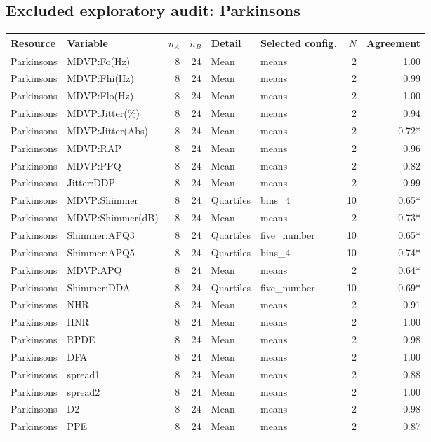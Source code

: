 \subsection*{Excluded exploratory audit: Parkinsons}
\small
\begin{longtable}{p{1.95cm}p{4.25cm}rrp{1.7cm}p{2.1cm}rr}
\toprule Resource & Variable & $n_A$ & $n_B$ & Detail & Selected config. & $N$ & Agreement\\\midrule\endhead
Parkinsons & MDVP:Fo(Hz) & 8 & 24 & Mean & means & 2 & 1.00\\
Parkinsons & MDVP:Fhi(Hz) & 8 & 24 & Mean & means & 2 & 0.99\\
Parkinsons & MDVP:Flo(Hz) & 8 & 24 & Mean & means & 2 & 1.00\\
Parkinsons & MDVP:Jitter(\%) & 8 & 24 & Mean & means & 2 & 0.94\\
Parkinsons & MDVP:Jitter(Abs) & 8 & 24 & Mean & means & 2 & 0.72*\\
Parkinsons & MDVP:RAP & 8 & 24 & Mean & means & 2 & 0.96\\
Parkinsons & MDVP:PPQ & 8 & 24 & Mean & means & 2 & 0.82\\
Parkinsons & Jitter:DDP & 8 & 24 & Mean & means & 2 & 0.99\\
Parkinsons & MDVP:Shimmer & 8 & 24 & Quartiles & bins\_4 & 10 & 0.65*\\
Parkinsons & MDVP:Shimmer(dB) & 8 & 24 & Mean & means & 2 & 0.73*\\
Parkinsons & Shimmer:APQ3 & 8 & 24 & Quartiles & five\_number & 10 & 0.65*\\
Parkinsons & Shimmer:APQ5 & 8 & 24 & Quartiles & bins\_4 & 10 & 0.74*\\
Parkinsons & MDVP:APQ & 8 & 24 & Mean & means & 2 & 0.64*\\
Parkinsons & Shimmer:DDA & 8 & 24 & Quartiles & five\_number & 10 & 0.69*\\
Parkinsons & NHR & 8 & 24 & Mean & means & 2 & 0.91\\
Parkinsons & HNR & 8 & 24 & Mean & means & 2 & 1.00\\
Parkinsons & RPDE & 8 & 24 & Mean & means & 2 & 0.98\\
Parkinsons & DFA & 8 & 24 & Mean & means & 2 & 1.00\\
Parkinsons & spread1 & 8 & 24 & Mean & means & 2 & 0.88\\
Parkinsons & spread2 & 8 & 24 & Mean & means & 2 & 1.00\\
Parkinsons & D2 & 8 & 24 & Mean & means & 2 & 0.98\\
Parkinsons & PPE & 8 & 24 & Mean & means & 2 & 0.87\\
\bottomrule\end{longtable}
\normalsize